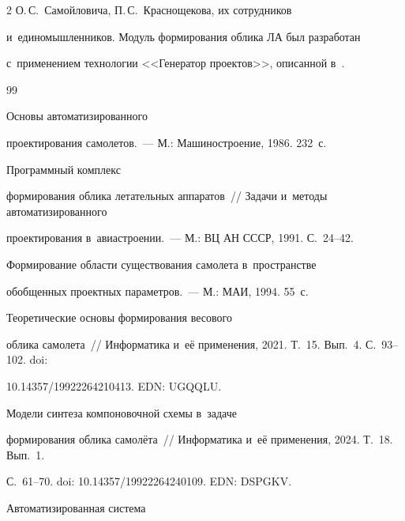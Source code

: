 \begin{multicols}{2}
О.\,С.~Самойловича, П.\,С.~Краснощекова, их сотрудников 


и~единомышленников. Модуль формирования облика ЛА был разработан 


с~применением технологии <<Генератор проектов>>, описанной в~\cite{18-fl}.


  


{\small\frenchspacing


 {\baselineskip=10.5pt




 \begin{thebibliography}{99}   




 Основы автоматизированного 


проектирования самолетов.~--- М.: Машиностроение, 1986. 232~с.




 Программный комплекс 


формирования облика летательных аппаратов~// Задачи и~методы автоматизированного 


проектирования в~авиастроении.~--- М.: ВЦ АН СССР, 1991. С.~24--42.




 Формирование области существования самолета в~пространстве 


обобщенных проектных параметров.~--- М.: МАИ, 1994. 55~с. 




 Теоретические основы формирования весового 


облика самолета~// Информатика и~её применения, 2021. Т.~15. Вып.~4. С.~93--102. doi: 


10.14357/19922264210413. EDN: UGQQLU.




 Модели синтеза компоновочной схемы в~задаче 


формирования облика самолёта~// Информатика и~её применения, 2024. Т.~18. Вып.~1.  


С.~61--70. doi: 10.14357/19922264240109. EDN: DSPGKV.




 Автоматизированная система 



\end{thebibliography}}}
\end{multicols}
